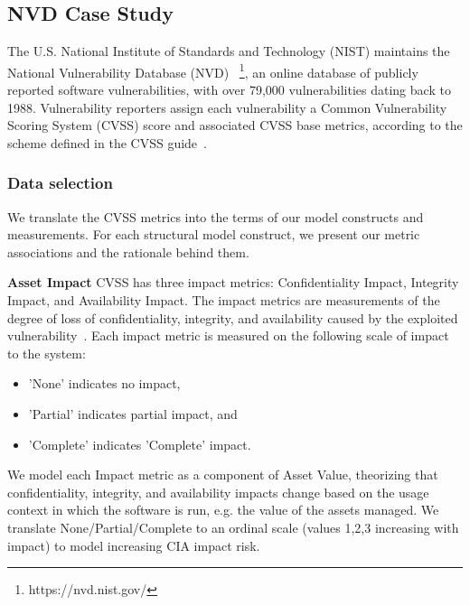 \subsection{NVD Case Study}
\label{sec:evaluation_nvd}
The U.S. National Institute of Standards and Technology (NIST) maintains the National Vulnerability Database (NVD) ~\footnote{https://nvd.nist.gov/}, an online database of publicly reported software vulnerabilities, with over 79,000 vulnerabilities dating back to 1988. Vulnerability reporters assign each vulnerability a Common Vulnerability Scoring System (CVSS) score and associated CVSS base metrics, according to the scheme defined in the CVSS guide~\cite{mell2007complete}.  

\subsubsection{Data selection}
\label{sec:evaluation_nvd_selection}
 We translate the CVSS metrics into the terms of our model constructs and measurements. For each structural model construct, we present our metric associations and the rationale behind them.
 
\textbf{Asset Impact}
CVSS has three impact metrics: Confidentiality Impact, Integrity Impact, and Availability Impact. The impact metrics are measurements of the degree of loss of confidentiality, integrity, and availability caused by the exploited vulnerability~\cite{mell2007complete}. Each impact metric is measured on the following scale of impact to the system:
	\begin{itemize}
		\item 'None' indicates no impact, 
		\item 'Partial' indicates partial impact, and 
		\item 'Complete' indicates 'Complete' impact.  
	\end{itemize}
We model each Impact metric as a component of Asset Value, theorizing that confidentiality, integrity, and availability impacts change based on the usage context in which the software is run, e.g. the value of the assets managed. We translate None/Partial/Complete to an ordinal scale (values 1,2,3 increasing with impact) to model increasing CIA impact risk.

